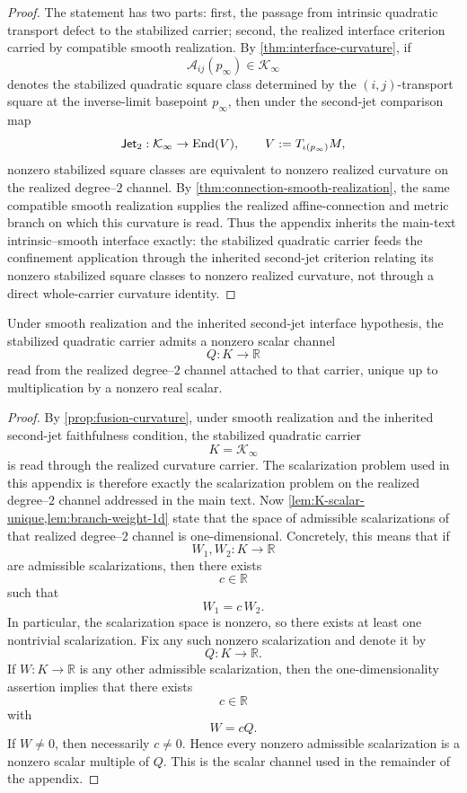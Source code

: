 \begin{proof}
	The statement has two parts: first, the passage from intrinsic quadratic
	transport defect to the stabilized carrier; second, the realized
	interface criterion carried by compatible smooth realization.
	By \cref{thm:interface-curvature}, if
	\[
		\mathcal A_{ij}(p_\infty)\in \mathcal K_\infty
	\]
	denotes the stabilized quadratic square class determined by the
	\((i,j)\)-transport square at the inverse-limit basepoint \(p_\infty\),
	then under the second-jet comparison map
	\[
		\mathsf{Jet}_2:\mathcal K_\infty\to \mathrm{End}(V),
		\qquad
		V:=T_{\iota(p_\infty)}M,
	\]
	nonzero stabilized square classes are equivalent to nonzero realized
	curvature on the realized degree--\(2\) channel.
	By \cref{thm:connection-smooth-realization}, the same compatible smooth
	realization supplies the realized affine-connection and metric branch on
	which this curvature is read.  Thus the appendix inherits the
	main-text intrinsic--smooth interface exactly: the stabilized quadratic carrier feeds the
	confinement application through the inherited second-jet criterion
	relating its nonzero stabilized square classes to nonzero realized
	curvature, not through a direct whole-carrier curvature identity.
\end{proof}
\begin{proposition}
	\label{prop:fusion-scalar}
	Under smooth realization and the inherited second-jet interface
	hypothesis, the stabilized quadratic carrier admits a nonzero scalar
	channel
	\[
		Q:K\to\mathbb R
	\]
	read from the realized degree--\(2\) channel attached to that carrier,
	unique up to multiplication by a nonzero real scalar.
\end{proposition}
\begin{proof}
	By \cref{prop:fusion-curvature}, under smooth realization and the
	inherited second-jet faithfulness condition, the stabilized quadratic
	carrier
	\[
		K=\mathcal K_\infty
	\]
	is read through the realized curvature carrier. The scalarization
	problem used in this appendix is therefore exactly the scalarization
	problem on the realized degree--\(2\) channel addressed in the main text.
	Now \cref{lem:K-scalar-unique,lem:branch-weight-1d} state that the space
	of admissible scalarizations of that realized degree--\(2\) channel is
	one-dimensional. Concretely, this means that if
	\[
		W_1,W_2:K\to\mathbb R
	\]
	are admissible scalarizations, then there exists
	\[
		c\in\mathbb R
	\]
	such that
	\[
		W_1=c\,W_2.
	\]
	In particular, the scalarization space is nonzero, so there exists at
	least one nontrivial scalarization. Fix any such nonzero scalarization
	and denote it by
	\[
		Q:K\to\mathbb R.
	\]
	If \(W:K\to\mathbb R\) is any other admissible scalarization, then the
	one-dimensionality assertion implies that there exists
	\[
		c\in\mathbb R
	\]
	with
	\[
		W=cQ.
	\]
	If \(W\neq 0\), then necessarily \(c\neq 0\). Hence every nonzero
	admissible scalarization is a nonzero scalar multiple of \(Q\).
	This is the scalar channel used in the remainder of the appendix.
\end{proof}
